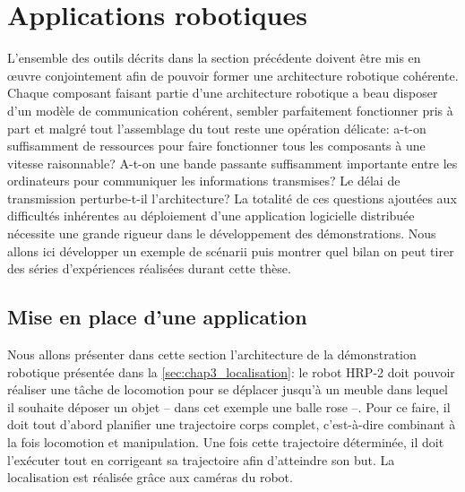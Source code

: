 \section{Applications robotiques}


L'ensemble des outils décrits dans la section précédente doivent être
mis en \oe uvre conjointement afin de pouvoir former une architecture
robotique cohérente. Chaque composant faisant partie d'une
architecture robotique a beau disposer d'un modèle de communication
cohérent, sembler parfaitement fonctionner pris à part et malgré tout
l'assemblage du tout reste une opération délicate: a-t-on suffisamment
de ressources pour faire fonctionner tous les composants à une vitesse
raisonnable? A-t-on une bande passante suffisamment importante entre
les ordinateurs pour communiquer les informations transmises? Le délai
de transmission perturbe-t-il l'architecture? La totalité de ces
questions ajoutées aux difficultés inhérentes au déploiement d'une
application logicielle distribuée nécessite une grande rigueur dans le
développement des démonstrations. Nous allons ici développer un
exemple de scénarii puis montrer quel bilan on peut tirer des séries
d'expériences réalisées durant cette thèse.


\subsection{Mise en place d'une application}


Nous allons présenter dans cette section l'architecture de la
démonstration robotique présentée dans la
\autoref{sec:chap3_localisation}: le robot HRP-2 doit pouvoir réaliser
une tâche de locomotion pour se déplacer jusqu'à un meuble dans lequel
il souhaite déposer un objet -- dans cet exemple une balle rose
--. Pour ce faire, il doit tout d'abord planifier une trajectoire
corps complet, c'est-à-dire combinant à la fois locomotion et
manipulation. Une fois cette trajectoire déterminée, il doit
l'exécuter tout en corrigeant sa trajectoire afin d'atteindre son
but. La localisation est réalisée grâce aux caméras du robot.

